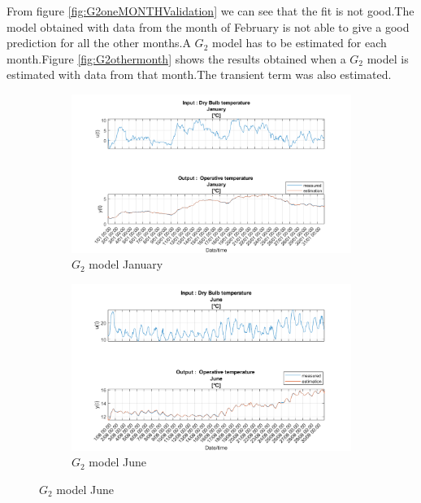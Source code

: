 \documentclass[a4paper,12pt]{report}
\numberwithin{equation}{section}
\begin{document}
From  figure \ref{fig:G2oneMONTHValidation} we can see that the fit is not good.The model obtained with data from the month of February is not able to give a good prediction for all the other months.A $G_{2}$ model has to be estimated for each month.Figure \ref{fig:G2othermonth} shows the results obtained when a  $G_{2}$ model is estimated with data from that month.The transient term was also estimated.

\begin{figure}[H]
\centering
\begin{subfigure}{\textwidth}
  \centering
  \includegraphics[width=\linewidth]{G2_Jan.png}
  \caption{$G_{2}$ model January}
  \label{fig:G2 Jan}
\end{subfigure}
\begin{subfigure}{\textwidth}
  \centering
  \includegraphics[width=\linewidth]{G2_June.png}
  \caption{$G_{2}$ model June}
  \label{fig:G2 June}
\end{subfigure}
\end{figure}
\clearpage
\end{document}
